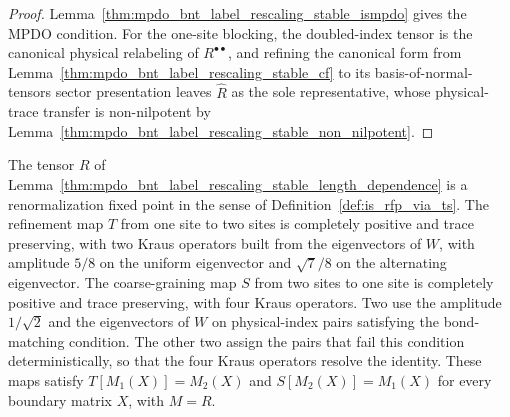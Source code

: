 \begin{proof}\leanok
    Lemma~\ref{thm:mpdo_bnt_label_rescaling_stable_ismpdo} gives the MPDO
    condition. For the one-site blocking, the doubled-index tensor is the
    canonical physical relabeling of $R^{\bullet\bullet}$, and refining the
    canonical form from Lemma~\ref{thm:mpdo_bnt_label_rescaling_stable_cf}
    to its basis-of-normal-tensors sector presentation leaves $\widehat R$ as
    the sole representative, whose physical-trace transfer is non-nilpotent by
    Lemma~\ref{thm:mpdo_bnt_label_rescaling_stable_non_nilpotent}.
\end{proof}

\begin{lemma}%
    \label{thm:mpdo_bnt_label_rescaling_stable_is_rfp_via_ts}
    \leanok
    The tensor $R$ of
    Lemma~\ref{thm:mpdo_bnt_label_rescaling_stable_length_dependence} is a
    renormalization fixed point in the sense of Definition~\ref{def:is_rfp_via_ts}.
    The refinement map $T$ from one site to two sites is completely positive
    and trace preserving, with
    two Kraus operators built from the eigenvectors of $W$, with amplitude
    $5/8$ on the uniform eigenvector and $\sqrt7/8$ on the alternating
    eigenvector. The coarse-graining map $S$ from two sites to one site is completely positive
    and trace preserving, with four Kraus
    operators. Two use the amplitude $1/\sqrt2$ and the eigenvectors of
    $W$ on physical-index pairs satisfying the bond-matching condition.
    The other two assign the pairs that fail this condition deterministically,
    so that the four Kraus operators resolve the identity.
    These maps satisfy $T[M_1(X)]=M_2(X)$ and $S[M_2(X)]=M_1(X)$
    for every boundary matrix $X$, with $M=R$.
\end{lemma}
